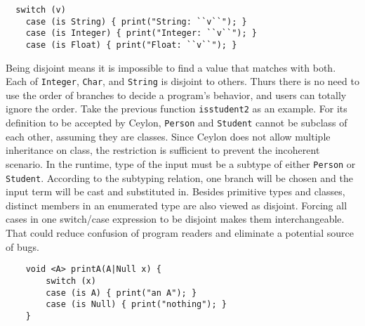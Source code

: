 \begin{lstlisting}
  switch (v)
    case (is String) { print("String: ``v``"); }
    case (is Integer) { print("Integer: ``v``"); }
    case (is Float) { print("Float: ``v``"); }
\end{lstlisting}

Being disjoint means it is impossible to find a value that matches with both.
Each of \lstinline{Integer}, \lstinline{Char}, and \lstinline{String} is
disjoint to others.
Thurs there is no need to use the order of branches to decide
a program's behavior, and users can totally ignore the order.
Take the previous function \lstinline{isstudent2} as an example.
For its definition to be accepted by Ceylon,
\lstinline{Person} and \lstinline{Student} cannot be subclass of
each other, assuming they are classes.
Since Ceylon does not allow multiple inheritance on class,
the restriction is sufficient to prevent the incoherent scenario.
In the runtime, type of the input must be a subtype of either \lstinline{Person} 
or \lstinline{Student}. According to the subtyping relation,
one branch will be chosen and the input term will be cast
and substituted in.
%
Besides primitive types and classes, 
distinct members in an enumerated type are also viewed as disjoint.
%
Forcing all cases in one switch/case expression to be disjoint makes them
interchangeable.
That could reduce confusion of program readers and eliminate a potential
source of bugs.

\begin{lstlisting}
	void <A> printA(A|Null x) {
		switch (x)
		case (is A) { print("an A"); }
		case (is Null) { print("nothing"); }
	}
\end{lstlisting}

